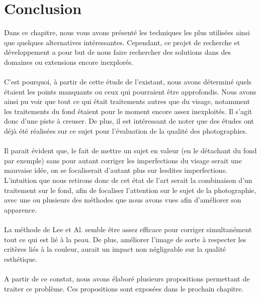 \documentclass[11pt, french,screen]{report-rd-info}
\begin{document}
\newpage
\section{Conclusion}
Dans ce chapitre, nous vous avons présenté les techniques les plus utilisées ainsi que quelques alternatives intéressantes. Cependant, ce projet de recherche et développement a pour but de nous faire rechercher des solutions dans des domaines ou extensions encore inexplorés.
\paragraph*{}
C’est pourquoi, à partir de cette étude de l’existant, nous avons déterminé quels étaient les points manquants ou ceux qui pourraient être approfondis. Nous avons ainsi pu voir que tout ce qui était traitements autres que du visage, notamment les traitements du fond étaient pour le moment encore assez inexploités. Il s’agit donc d’une piste à creuser. De plus, il est intéressant de noter que des études ont déjà été réalisées sur ce sujet pour l’évaluation de la qualité des photographies.
\paragraph*{}
Il parait évident que, le fait de mettre un sujet en valeur (en le détachant du fond par exemple) sans pour autant corriger les imperfections du visage serait une mauvaise idée, on se focaliserait d’autant plus sur lesdites imperfections. L’intuition que nous retirons donc de cet état de l’art serait la combinaison d’un traitement sur le fond, afin de focaliser l’attention sur le sujet de la photographie, avec une ou plusieurs des méthodes que nous avons vues afin d’améliorer son apparence. 
\paragraph*{}
La méthode de Lee et Al.\cite{Lee} semble être assez efficace pour corriger simultanément tout ce qui est lié à la peau. De plus, améliorer l'image de sorte à respecter les critères liés à la couleur, aurait un impact non négligeable sur la qualité esthétique. 
\paragraph*{}
A partir de ce constat, nous avons élaboré plusieurs propositions permettant de traiter ce problème. Ces propositions sont exposées dans le prochain chapitre.
\end{document}
